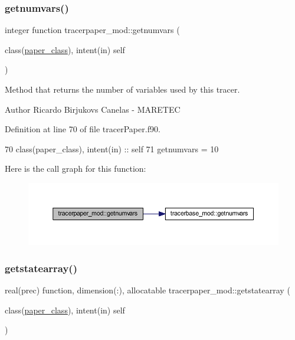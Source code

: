 \subsubsection{\texorpdfstring{getnumvars()}{getnumvars()}}
{\footnotesize\ttfamily integer function tracerpaper\+\_\+mod\+::getnumvars (\begin{DoxyParamCaption}\item[{class(\mbox{\hyperlink{structtracerpaper__mod_1_1paper__class}{paper\+\_\+class}}), intent(in)}]{self }\end{DoxyParamCaption})\hspace{0.3cm}{\ttfamily [private]}}



Method that returns the number of variables used by this tracer. 

\begin{DoxyAuthor}{Author}
Ricardo Birjukovs Canelas -\/ M\+A\+R\+E\+T\+EC 
\end{DoxyAuthor}


Definition at line 70 of file tracer\+Paper.\+f90.


\begin{DoxyCode}
70     \textcolor{keywordtype}{class}(paper\_class), \textcolor{keywordtype}{intent(in)} :: self
71     getnumvars = 10
\end{DoxyCode}
Here is the call graph for this function\+:\nopagebreak
\begin{figure}[H]
\begin{center}
\leavevmode
\includegraphics[width=350pt]{namespacetracerpaper__mod_a62f88159b0746351f3b3a09a6a9dfff4_cgraph}
\end{center}
\end{figure}
\mbox{\label{namespacetracerpaper__mod_a703693333469e5091ec8de0a62171294}} 
\subsubsection{\texorpdfstring{getstatearray()}{getstatearray()}}
{\footnotesize\ttfamily real(prec) function, dimension(\+:), allocatable tracerpaper\+\_\+mod\+::getstatearray (\begin{DoxyParamCaption}\item[{class(\mbox{\hyperlink{structtracerpaper__mod_1_1paper__class}{paper\+\_\+class}}), intent(in)}]{self }\end{DoxyParamCaption})\hspace{0.3cm}{\ttfamily [private]}}



